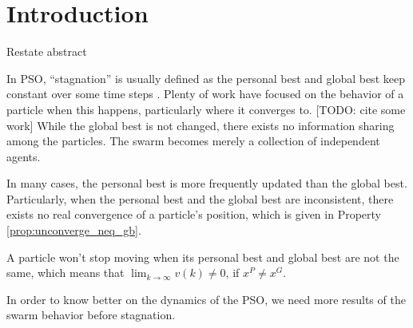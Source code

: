 \section{Introduction}
\label{sec:introduction}

Restate abstract 


In PSO, ``stagnation'' is usually defined as the personal best and global best keep constant over some time steps \cite{4223160}.
Plenty of work have focused on the behavior of a particle when this happens, particularly where it converges to. [TODO: cite some work]
While the global best is not changed, there exists no information sharing among the particles.
The swarm becomes merely a collection of independent agents.

In many cases, the personal best is more frequently updated than the global best.
Particularly, when the personal best and the global best are inconsistent, there exists no real convergence of a particle's position, which is given in Property \ref{prop:unconverge_neq_gb}.
\begin{myprop}
\label{prop:unconverge_neq_gb}
A particle won't stop moving when its personal best and global best are not the same, 
which means that 
$ \lim_{k \rightarrow \infty} v(k) \neq 0 $, if $ x^{P} \neq x^{G} $.
\end{myprop}

In order to know better on the dynamics of the PSO, we need more results of the swarm behavior before stagnation.
